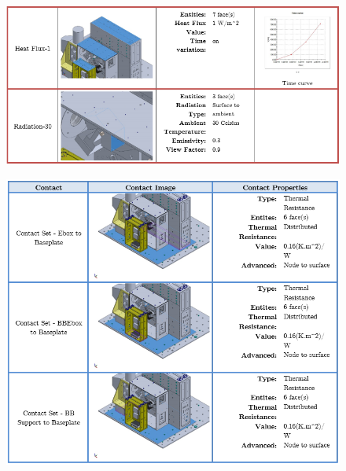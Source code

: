 \begin{figure}
    \centering
    \includegraphics[width=\textwidth]{thermal_load_images/sunrise_TL_images/sunrise_11.PNG}
\end{figure}

\begin{figure}
    \centering
    \includegraphics[width=\textwidth]{thermal_load_images/sunrise_TL_images/sunrise_12.PNG}
\end{figure}

